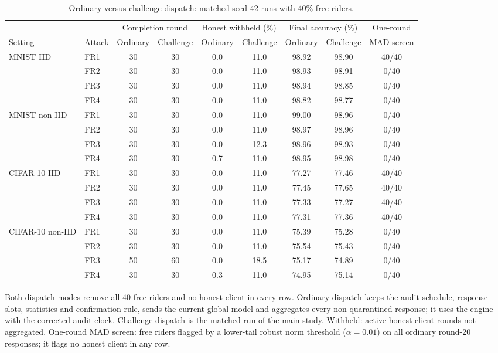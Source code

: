 \documentclass[journal]{IEEEtran}
\begin{document}
\begin{table}[t]\centering\footnotesize\setlength{\tabcolsep}{4.5pt}
\caption{Ordinary versus challenge dispatch: matched seed-42 runs with 40\% free riders.}\label{tab:passive}
\begin{tabular}{llcccccc@{\hspace{10pt}}c}\toprule
& & \multicolumn{2}{c}{Completion round} & \multicolumn{2}{c}{Honest withheld (\%)} & \multicolumn{2}{c}{Final accuracy (\%)} & One-round \\
\cmidrule(lr){3-4}\cmidrule(lr){5-6}\cmidrule(lr){7-8}
Setting & Attack & Ordinary & Challenge & Ordinary & Challenge & Ordinary & Challenge & MAD screen \\ \midrule
MNIST IID & FR1 & 30 & 30 & 0.0 & 11.0 & 98.92 & 98.90 & 40/40 \\
 & FR2 & 30 & 30 & 0.0 & 11.0 & 98.93 & 98.91 & 0/40 \\
 & FR3 & 30 & 30 & 0.0 & 11.0 & 98.94 & 98.85 & 0/40 \\
 & FR4 & 30 & 30 & 0.0 & 11.0 & 98.82 & 98.77 & 0/40 \\
\midrule
MNIST non-IID & FR1 & 30 & 30 & 0.0 & 11.0 & 99.00 & 98.96 & 0/40 \\
 & FR2 & 30 & 30 & 0.0 & 11.0 & 98.97 & 98.96 & 0/40 \\
 & FR3 & 30 & 30 & 0.0 & 12.3 & 98.96 & 98.93 & 0/40 \\
 & FR4 & 30 & 30 & 0.7 & 11.0 & 98.95 & 98.98 & 0/40 \\
\midrule
CIFAR-10 IID & FR1 & 30 & 30 & 0.0 & 11.0 & 77.27 & 77.46 & 40/40 \\
 & FR2 & 30 & 30 & 0.0 & 11.0 & 77.45 & 77.65 & 40/40 \\
 & FR3 & 30 & 30 & 0.0 & 11.0 & 77.33 & 77.27 & 40/40 \\
 & FR4 & 30 & 30 & 0.0 & 11.0 & 77.31 & 77.36 & 40/40 \\
\midrule
CIFAR-10 non-IID & FR1 & 30 & 30 & 0.0 & 11.0 & 75.39 & 75.28 & 0/40 \\
 & FR2 & 30 & 30 & 0.0 & 11.0 & 75.54 & 75.43 & 0/40 \\
 & FR3 & 50 & 60 & 0.0 & 18.5 & 75.17 & 74.89 & 0/40 \\
 & FR4 & 30 & 30 & 0.3 & 11.0 & 74.95 & 75.14 & 0/40 \\
\bottomrule
\end{tabular}
\par\smallskip\parbox{.96\textwidth}{\scriptsize Both dispatch modes remove all 40 free riders and no honest client in every row. Ordinary dispatch keeps the audit schedule, response slots, statistics and confirmation rule, sends the current global model and aggregates every non-quarantined response; it uses the engine with the corrected audit clock. Challenge dispatch is the matched run of the main study. Withheld: active honest client-rounds not aggregated. One-round MAD screen: free riders flagged by a lower-tail robust norm threshold ($\alpha=0.01$) on all ordinary round-20 responses; it flags no honest client in any row.}
\end{table}
\end{document}
